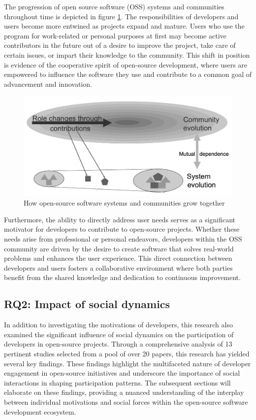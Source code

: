 The progression of open source software (OSS) systems and communities throughout time is depicted in figure \ref{fig:roleMotivation}.  The responsibilities of developers and users become more entwined as projects expand and mature.  Users who use the program for work-related or personal purposes at first may become active contributors in the future out of a desire to improve the project, take care of certain issues, or impart their knowledge to the community.  This shift in position is evidence of the cooperative spirit of open-source development, where users are empowered to influence the software they use and contribute to a common goal of advancement and innovation.


\begin{figure}[ht]
    \centering
    \includegraphics[width=0.65\linewidth]{figs/roleMotivation.png}
    \caption{How open-source software systems and communities grow together \cite{06ye2003toward} }
    \label{fig:roleMotivation}
\end{figure}



Furthermore, the ability to directly address user needs serves as a significant motivator for developers to contribute to open-source projects.  Whether these needs arise from professional or personal endeavors, developers within the OSS community are driven by the desire to create software that solves real-world problems and enhances the user experience.  This direct connection between developers and users fosters a collaborative environment where both parties benefit from the shared knowledge and dedication to continuous improvement.

\subsection{RQ2: Impact of social dynamics}

In addition to investigating the motivations of developers, this research also examined the significant influence of social dynamics on the participation of developers in open-source projects. Through a comprehensive analysis of 13 pertinent studies selected from a pool of over 20 papers, this research has yielded several key findings. These findings highlight the multifaceted nature of developer engagement in open-source initiatives and underscore the importance of social interactions in shaping participation patterns. The subsequent sections will elaborate on these findings, providing a nuanced understanding of the interplay between individual motivations and social forces within the open-source software development ecosystem.

